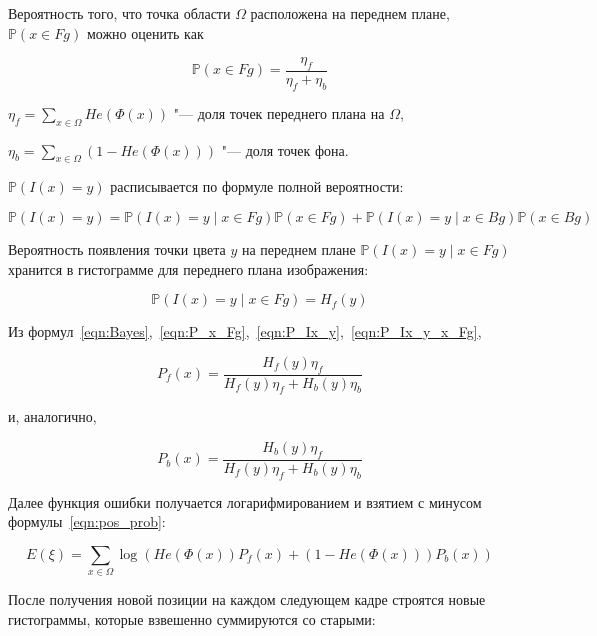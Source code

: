 Вероятность того, что точка области $\Omega$ расположена на переднем плане,
$\mathbb{P}(x \in Fg)$ можно оценить как

\begin{equation}
\label{eqn:P_x_Fg}
\mathbb{P}(x \in Fg) = \frac{\eta_f}{\eta_f + \eta_b}
\end{equation}

$
    \eta_f = \sum\limits_{x \in \Omega}He(\Phi(x))
$ "--- доля точек переднего плана на $\Omega$,

$
    \eta_b = \sum\limits_{x \in \Omega}(1 - He(\Phi(x)))
$ "--- доля точек фона.

$\mathbb{P}(I(x) = y)$ расписывается по формуле полной вероятности:

\begin{equation}
\label{eqn:P_Ix_y}
\mathbb{P}(I(x) = y) = \mathbb{P}(I(x) = y \mid x \in Fg) \mathbb{P}(x \in Fg)
+ \mathbb{P}(I(x) = y \mid x \in Bg) \mathbb{P}(x \in Bg)
\end{equation}

 Вероятность появления точки цвета $y$ на переднем плане $\mathbb{P}(I(x) = y \mid x \in Fg)$ хранится в гистограмме для переднего плана изображения:

\begin{equation}
\label{eqn:P_Ix_y_x_Fg}
\mathbb{P}(I(x) = y \mid x \in Fg) = H_f(y)
\end{equation}

Из формул~\ref{eqn:Bayes},~\ref{eqn:P_x_Fg},~\ref{eqn:P_Ix_y},~\ref{eqn:P_Ix_y_x_Fg}, 

\begin{equation}
\label{eqn:P_x_Fg_y}
P_f(x)= \frac{H_f(y)\eta_f}{H_f(y)\eta_f + H_b(y)\eta_b}
\end{equation}

и, аналогично,

\begin{equation}
\label{eqn:P_x_Bg_y}
P_b(x) = \frac{H_b(y)\eta_f}{H_f(y)\eta_f + H_b(y)\eta_b}
\end{equation}

Далее функция ошибки получается логарифмированием и взятием с минусом формулы~\ref{eqn:pos_prob}:

\begin{equation}
\label{err_func}
E(\xi) = \sum\limits_{x \in \Omega}
\log(He(\Phi(x))P_f(x) + (1 - He(\Phi(x)))P_b(x))
\end{equation}

После получения новой позиции на каждом следующем кадре строятся новые
гистограммы, которые взвешенно суммируются со старыми: 

